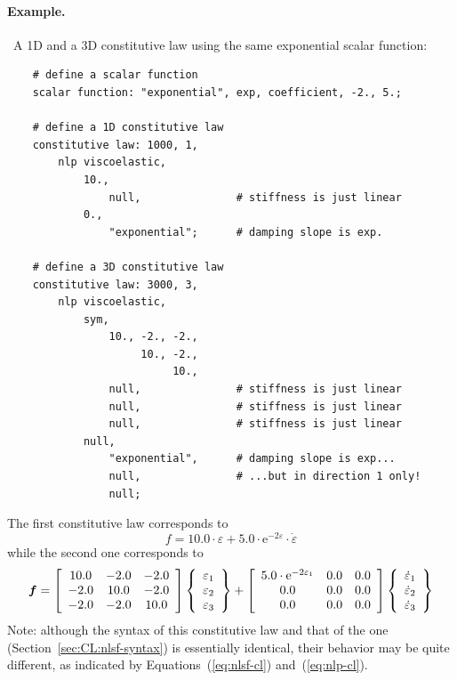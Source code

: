 \paragraph{Example.} \
A 1D and a 3D constitutive law using the same exponential scalar function:
\begin{verbatim}
    # define a scalar function
    scalar function: "exponential", exp, coefficient, -2., 5.;

    # define a 1D constitutive law
    constitutive law: 1000, 1,
        nlp viscoelastic,
            10.,
                null,               # stiffness is just linear
            0.,
                "exponential";      # damping slope is exp.

    # define a 3D constitutive law
    constitutive law: 3000, 3,
        nlp viscoelastic,
            sym,
                10., -2., -2.,
                     10., -2.,
                          10.,
                null,               # stiffness is just linear
                null,               # stiffness is just linear
                null,               # stiffness is just linear
            null,
                "exponential",      # damping slope is exp...
                null,               # ...but in direction 1 only!
                null;
\end{verbatim}
The first constitutive law corresponds to
\begin{equation}
        f = 10.0 \cdot \varepsilon
        + 5.0 \cdot \mathrm{e}^{-2 \varepsilon} \cdot \dot{\varepsilon}
\end{equation}
while the second one corresponds to
\begin{equation}
        \T{f} = \sqbr{\matr{ccc}{
                10.0 & -2.0 & -2.0 \\
                -2.0 & 10.0 & -2.0 \\
                -2.0 & -2.0 & 10.0
        }} \cubr{\cvvect{
                \varepsilon_1 \\
                \varepsilon_2 \\
                \varepsilon_3
        }} + \sqbr{\matr{ccc}{
                5.0 \cdot \mathrm{e}^{-2 \varepsilon_1} & 0.0 & 0.0 \\
                0.0 & 0.0 & 0.0 \\
                0.0 & 0.0 & 0.0
        }} \cubr{\cvvect{
                \dot{\varepsilon}_1 \\
                \dot{\varepsilon}_2 \\
                \dot{\varepsilon}_3
        }}
\end{equation}
Note: although the syntax of this constitutive law
and that of the  one
(Section~\ref{sec:CL:nlsf-syntax})
is essentially identical, their behavior may be quite different,
as indicated by Equations~(\ref{eq:nlsf-cl}) and~(\ref{eq:nlp-cl}).


